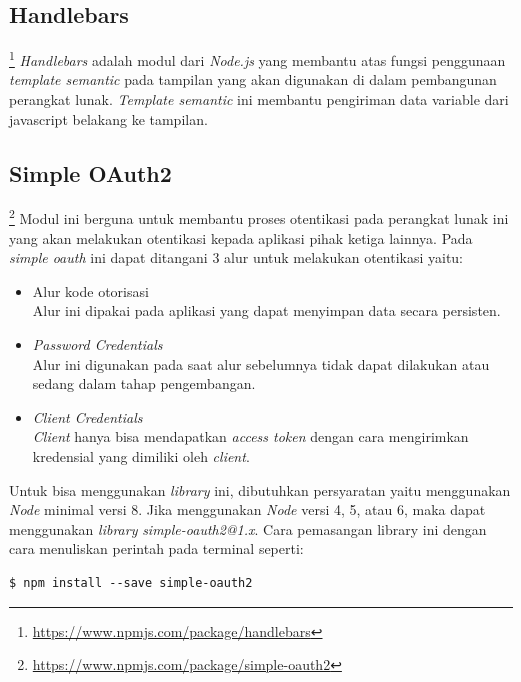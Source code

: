 \subsection{Handlebars}\footnote{\url{https://www.npmjs.com/package/handlebars}}
\textit{Handlebars} adalah modul dari \textit{Node.js} yang membantu atas fungsi penggunaan \textit{template semantic} pada tampilan yang akan digunakan di dalam pembangunan perangkat lunak. \textit{Template semantic} ini membantu pengiriman data variable dari javascript belakang ke tampilan. 

\subsection{Simple OAuth2}\footnote{\url{https://www.npmjs.com/package/simple-oauth2}}
Modul ini berguna untuk membantu proses otentikasi pada perangkat lunak ini yang akan melakukan otentikasi kepada aplikasi pihak ketiga lainnya. Pada \textit{simple oauth} ini dapat ditangani 3 alur untuk melakukan otentikasi yaitu:
\begin{itemize}
    \item Alur kode otorisasi\\
    Alur ini dipakai pada aplikasi yang dapat menyimpan data secara persisten. 
    \item \textit{Password Credentials}\\
    Alur ini digunakan pada saat alur sebelumnya tidak dapat dilakukan atau sedang dalam tahap pengembangan. 
    \item \textit{Client Credentials}\\
    \textit{Client} hanya bisa mendapatkan \textit{access token} dengan cara mengirimkan kredensial yang dimiliki oleh \textit{client}. 
\end{itemize}

Untuk bisa menggunakan \textit{library} ini, dibutuhkan persyaratan yaitu menggunakan \textit{Node} minimal versi 8. Jika menggunakan \textit{Node} versi 4, 5, atau 6, maka dapat menggunakan \textit{library} \textit{simple-oauth2@1.x}. Cara pemasangan library ini dengan cara menuliskan perintah pada terminal seperti: 

\begin{lstlisting}
$ npm install --save simple-oauth2
\end{lstlisting}


